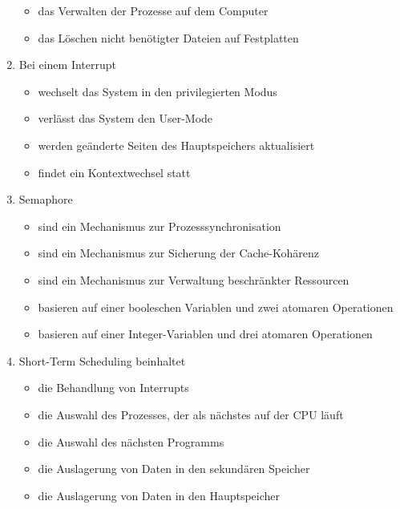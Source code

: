 \documentclass{exercisesheet}
\begin{document}
\begin{enumerate}
\begin{itemize}
          \item das Verwalten der Prozesse auf dem Computer \psolution{\checkmark}
          \item das Löschen nicht benötigter Dateien auf Festplatten \psolution{\xmark}
        \end{itemize}
  \item Bei einem Interrupt
        \begin{itemize}
          \item wechselt das System in den privilegierten Modus \psolution{\checkmark}
          \item verlässt das System den User-Mode \psolution{\checkmark}
          \item werden geänderte Seiten des Hauptspeichers aktualisiert \psolution{\xmark}
          \item findet ein Kontextwechsel statt \psolution{\checkmark}
        \end{itemize}
  \item Semaphore
        \begin{itemize}
          \item sind ein Mechanismus zur Prozesssynchronisation \psolution{\checkmark}
          \item sind ein Mechanismus zur Sicherung der Cache-Kohärenz \psolution{\xmark}
          \item sind ein Mechanismus zur Verwaltung beschränkter Ressourcen \psolution{\checkmark}
          \item basieren auf einer booleschen Variablen und zwei atomaren Operationen \psolution{\xmark}
          \item basieren auf einer Integer-Variablen und drei atomaren Operationen \psolution{\checkmark}
        \end{itemize}
  \item Short-Term Scheduling beinhaltet
        \begin{itemize}
          \item die Behandlung von Interrupts \psolution{\checkmark}
          \item die Auswahl des Prozesses, der als nächstes auf der CPU läuft \psolution{\checkmark}
          \item die Auswahl des nächsten Programms \psolution{\xmark}
          \item die Auslagerung von Daten in den sekundären Speicher \psolution{\xmark}
          \item die Auslagerung von Daten in den Hauptspeicher \psolution{\xmark}

\end{itemize}
\end{enumerate}
\end{document}
